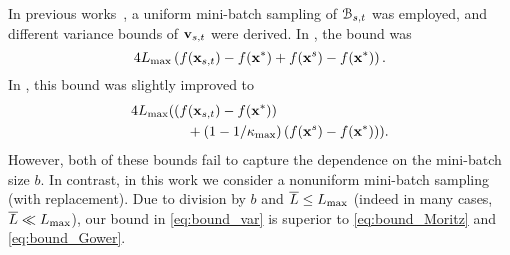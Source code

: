 \documentclass[10pt,twocolumn,journal]{IEEEtran}
\begin{document}
\begin{remark}
In previous works~\cite{Moritz_16,Gower_16}, a uniform mini-batch sampling of $\mathcal{B}_{s,t}$ was employed, and different variance bounds of $\mathbf{v}_{s,t}$ were derived.  In \cite[Lemma 6]{Moritz_16}, the bound was 
\begin{equation}
4L_{\max}\left(f(\mathbf{x}_{s,t})-f(\mathbf{x}^*)+f(\mathbf{x}^s)-f(\mathbf{x}^*)\right).\label{eq:bound_Moritz}
\end{equation}
In \cite[Lemma 2]{Gower_16}, this bound was slightly improved   to %
\begin{align}
&4L_{\max}((f(\mathbf{x}_{s,t})-f(\mathbf{x}^*))\nonumber\\
&\quad\quad\quad\quad+\left(1-{1}/{\kappa_{\max}}\right)(f(\mathbf{x}^s)-f(\mathbf{x}^*))).\label{eq:bound_Gower}
\end{align}
However, both of these bounds fail to capture the dependence on the mini-batch size $b$. %
In contrast, in this work we consider a nonuniform mini-batch sampling (with replacement). Due to division by $b$ and $\overline{L}\le L_{\max}$ (indeed in many cases, $\overline{L}\ll L_{\max}$), our bound in \eqref{eq:bound_var} is superior to \eqref{eq:bound_Moritz}  and \eqref{eq:bound_Gower}. 

\end{remark}
\end{document}
